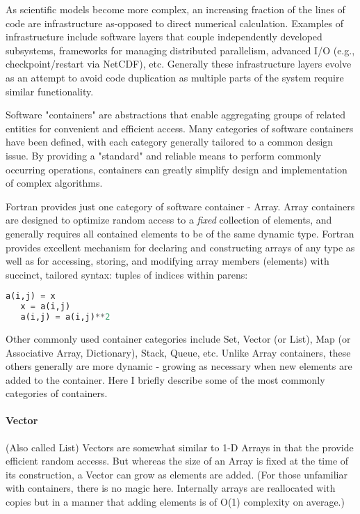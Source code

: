 \documentclass{article}
\begin{document}
 As scientific models become more complex, an increasing fraction of
   the lines of code are infrastructure as-opposed to direct
   numerical calculation.  Examples of infrastructure include software
   layers that couple independently developed subsystems, frameworks
   for managing distributed parallelism, advanced I/O (e.g.,
   checkpoint/restart via NetCDF), etc.  Generally these
   infrastructure layers evolve as an attempt to avoid code
   duplication as multiple parts of the system require similar
   functionality.

 Software "containers" are abstractions that enable aggregating groups of related entities for convenient and efficient access.   Many categories of software containers have been defined, with each   category generally tailored to a common design issue.  By providing a   "standard" and reliable means to perform commonly occurring   operations, containers can greatly simplify design and   implementation of complex algorithms.

Fortran provides just one category of software container - Array.   Array containers are designed to optimize random access to a  {\em fixed} collection of elements, and generally requires all   contained elements to be of the same dynamic type.  Fortran   provides excellent mechanism for declaring and constructing arrays   of any type as well as for accessing, storing, and modifying array    members (elements) with succinct, tailored syntax: tuples of indices within parens:
   
\begin{lstlisting}[language=Python]
   a(i,j) = x
   x = a(i,j)
   a(i,j) = a(i,j)**2
\end{lstlisting}


 Other commonly used container categories include Set, Vector (or   List), Map (or Associative Array, Dictionary), Stack, Queue, etc.   Unlike Array containers, these others generally are more dynamic -   growing as necessary when new elements are added to the container.   Here I briefly describe some of the most commonly categories of   containers.


\paragraph{Vector} (Also called List) Vectors are somewhat similar to 1-D Arrays in that the provide efficient random accesss.  But whereas the size of an Array is fixed at the time of its construction, a Vector can grow as elements are added.  (For those unfamiliar with containers, there is no magic here.  Internally arrays are reallocated with copies but in a manner that adding elements is of O(1)      complexity on average.)
\end{document}
